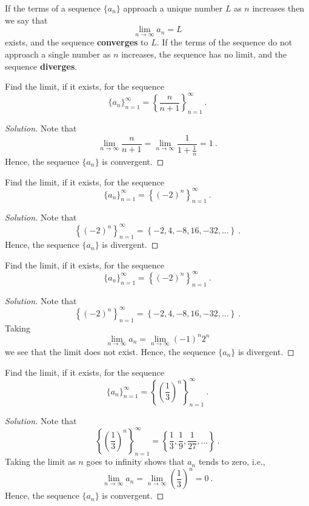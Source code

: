 \documentclass[compacto,10pt,comentarios]{aleph-notas}
\begin{document}
\begin{defi}
    If the terms of a sequence $\{a_n\}$ approach a unique number $L$ as $n$ increases then we say that
    $$
        \lim_{n \to \infty} a_n = L
    $$
    exists, and the sequence \textbf{converges} to $L$. If the terms of the sequence do not approach a single number as $n$ increases, the sequence has no limit, and the sequence \textbf{diverges}.
\end{defi}

\begin{ejer}
    Find the limit, if it exists, for the sequence
    $$
        \{a_n\}_{n=1}^{\infty} = \left\{\frac{n}{n+1}\right\}_{n=1}^{\infty} ~ .
    $$
\end{ejer}
\begin{proof}[Solution]
    Note that
    $$
        \lim_{n \to \infty} \frac{n}{n+1} = \lim_{n \to \infty} \frac{1}{1 + \frac{1}{n}} = 1 ~ .
    $$
    Hence, the sequence $\{a_n\}$ is convergent.
\end{proof}

\begin{ejer}
    Find the limit, if it exists, for the sequence
    $$
        \{a_n\}_{n=1}^{\infty} = \left\{ (-2)^{n} \right\}_{n=1}^{\infty} ~ .
    $$
\end{ejer}
\begin{proof}[Solution]
    Note that
    $$
        \left\{ (-2)^{n} \right\}_{n=1}^{\infty} = \left\{ -2, 4, -8, 16, -32, \ldots \right\} ~ .
    $$
    Hence, the sequence $\{a_n\}$ is divergent.
\end{proof}

\begin{ejer}
    Find the limit, if it exists, for the sequence
    $$
        \{a_n\}_{n=1}^{\infty} = \left\{ (-2)^{n} \right\}_{n=1}^{\infty} ~ .
    $$
\end{ejer}
\begin{proof}[Solution]
    Note that
    $$
        \left\{ (-2)^{n} \right\}_{n=1}^{\infty} = \left\{ -2, 4, -8, 16, -32, \ldots \right\} ~ .
    $$
    Taking
    $$
        \lim_{n \to \infty} a_n = \lim_{n \to \infty} (-1)^{n} 2^{n}
    $$ 
    we see that the limit does not exist. Hence, the sequence $\{a_n\}$ is divergent.
\end{proof}

\begin{ejer}
    Find the limit, if it exists, for the sequence
    $$
        \{a_n\}_{n=1}^{\infty} = \left\{ \left(\frac{1}{3}\right)^{n} \right\}_{n=1}^{\infty} ~ .
    $$
\end{ejer}
\begin{proof}[Solution]
    Note that
    $$
        \left\{ \left(\frac{1}{3}\right)^{n} \right\}_{n=1}^{\infty} = \left\{ \frac{1}{3}, \frac{1}{9}, \frac{1}{27}, \ldots \right\} ~ .
    $$
    Taking the limit as $n$ goes to infinity shows that $a_n$ tends to zero, i.e.,
    $$
        \lim_{n \to \infty} a_n = \lim_{n \to \infty} \left(\frac{1}{3}\right)^{n} = 0 ~ .
    $$ 
    Hence, the sequence $\{a_n\}$ is convergent.
\end{proof}
\end{document}
